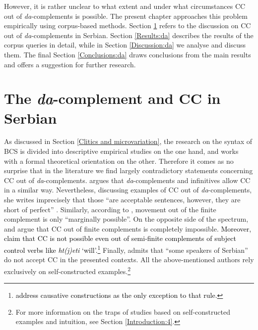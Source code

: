 \noindent However, it is rather unclear to what extent and under what circumstances CC out of \textit{da}-complements is possible. The present chapter approaches this problem empirically using corpus-based methods. Section \ref{The da-complement and CC in Serbian} refers to the discussion on CC out of \textit{da}-complements in Serbian. Section \ref{Results:da} describes the results of the corpus queries in detail, while in Section \ref{Discussion:da} we analyse  and discuss them. The final Section \ref{Conclusions:da} draws conclusions from the main results and offers a suggestion for further research.

\section{The \textit{da}-complement and CC in Serbian}
\label{The da-complement and CC in Serbian}

As discussed in Section \ref{Clitics and microvariation}, the research on the syntax of BCS is divided into descriptive empirical studies on the one hand, and works with a formal theoretical orientation on the other. Therefore it comes as no surprise that in the literature we find largely contradictory statements concerning CC out of \textit{da}-complements. \citet[174ff]{Stjepanovic04} argues that \textit{da}-complements and infinitives allow CC in a similar way. Nevertheless, discussing examples of CC out of \textit{da}-complements, she writes imprecisely that those “are acceptable sentences, however, they are short of perfect” \citep[cf.][201]{Stjepanovic04}. Similarly, according to \citet[243]{FranksKing00}, movement out of the finite complement is only “marginally possible”. On the opposite side of the spectrum, \citet[41]{CavarWilder94} and \citet[41]{Browne03} argue that CC out of finite complements is completely impossible. \textcolor{black}{Moreover, \citet[448]{CavarWilder94} claim that CC is not possible even out of semi-finite complements of subject control verbs like \textit{ht(j)eti} ‘will’.}\footnote{\textcolor{black}{\citet[448]{CavarWilder94} address causative constructions as the only exception to that rule.}} Finally, \citet[146]{Progovac05} admits that “some speakers of Serbian” do not accept CC in the presented contexts. All the above-mentioned authors rely exclusively on self-constructed examples.\footnote{For more information on the traps of studies based on self-constructed examples and intuition, see Section \ref{Introduction:4}.}

